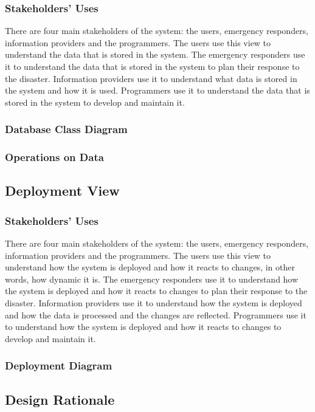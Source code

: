 \documentclass[a4paper]{article}
\begin{document}
    \subsubsection{Stakeholders' Uses}
    There are four main stakeholders of the system: the users, emergency responders, information providers and the programmers.
    The users use this view to understand the data that is stored in the system. The emergency responders use it to understand
    the data that is stored in the system to plan their response to the disaster. Information providers use it to understand
    what data is stored in the system and how it is used. Programmers use it to understand the data that is stored in the system
    to develop and maintain it.
    \subsubsection{Database Class Diagram}
    \subsubsection{Operations on Data}
    \lipsum[1-1] %
    \subsection{Deployment View}
    \subsubsection{Stakeholders' Uses}
    There are four main stakeholders of the system: the users, emergency responders, information providers and the programmers.
    The users use this view to understand how the system is deployed and how it reacts to changes, in other words, how dynamic it is.
    The emergency responders use it to understand how the system is deployed and how it reacts to changes to plan their response
    to the disaster. Information providers use it to understand how the system is deployed and how the data is processed and the
    changes are reflected. Programmers use it to understand how the system is deployed and how it reacts to changes to develop
    and maintain it.
    \subsubsection{Deployment Diagram}
    \subsection{Design Rationale}
\end{document}
